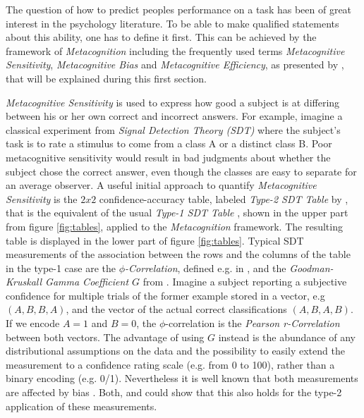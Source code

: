 \documentclass[../main/main.tex]{subfiles}
\begin{document}
	The question of how to predict peoples performance on a task has been of great interest in the psychology literature. To be able to make qualified statements about this ability, one has to define it first. This can be achieved by the framework of \textit{Metacognition} including the frequently used terms \textit{Metacognitive Sensitivity}, \textit{Metacognitive Bias} and \textit{Metacognitive Efficiency}, as presented by \citep{fleming2014measure}, that will be explained during this first section.
	
	\textit{Metacognitive Sensitivity} is used to express how good a subject is at differing between his or her own correct and incorrect answers. For example, imagine a classical experiment from \textit{Signal Detection Theory (SDT)} where the subject's task is to rate a stimulus to come from a class A or a distinct class B. Poor metacognitive sensitivity would result in bad judgments about whether the subject chose the correct answer, even though the classes are easy to separate for an average observer. A useful initial approach to quantify \textit{Metacognitive Sensitivity} is the $2x2$ confidence-accuracy table, labeled \textit{Type-2 SDT Table} by \citep{fleming2014measure}, that is the equivalent of the usual \textit{Type-1 SDT Table} \citep{cramer1999mathematical}, shown in the upper part from figure \ref{fig:tables}, applied to the \textit{Metacognition} framework. The resulting table is displayed in the lower part of figure \ref{fig:tables}. Typical SDT measurements of the association between the rows and the columns of the table in the type-1 case are the \textit{$\phi$-Correlation}, defined e.g. in \citep{cramer1999mathematical}, and the \textit{Goodman-Kruskall Gamma Coefficient $G$} from \citep{goodman1963measures}. Imagine a subject reporting a subjective confidence for multiple trials of the former example stored in a vector, e.g $(A, B, B, A)$, and the vector of the actual correct classifications $(A, B, A, B)$. If we encode $A=1$ and $B=0$, the $\phi$-correlation is the \textit{Pearson r-Correlation} between both vectors. The advantage of using $G$ instead is the abundance of any distributional assumptions on the data and the possibility to easily extend the measurement to a confidence rating scale (e.g. from 0 to 100), rather than a binary encoding (e.g. 0/1). Nevertheless it is well known that both measurements are affected by bias \citep{fleming2014measure}. Both, \citep{nelson1984comparison} and \citep{masson2009sources} could show that this also holds for the type-2 application of these measurements.
\end{document}
